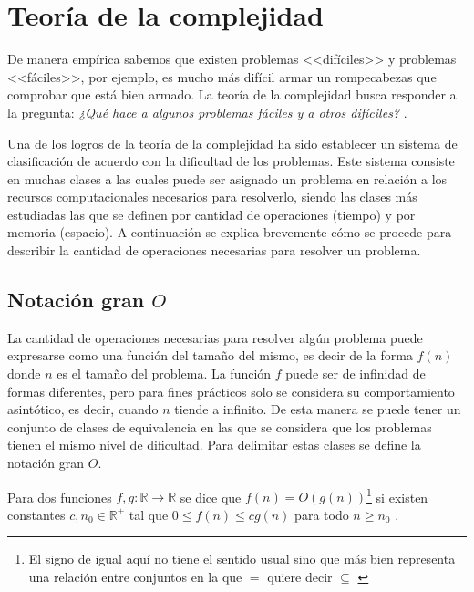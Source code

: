 \section{Teoría de la complejidad}
De manera empírica sabemos que existen problemas <<difíciles>> y problemas <<fáciles>>, por ejemplo, es mucho más difícil armar un rompecabezas que comprobar que está bien armado. La teoría de la complejidad busca responder a la pregunta: \textit{¿Qué hace a algunos problemas fáciles y a otros difíciles?} \cite{sipser1996introduction}. 

Una de los logros de la teoría de la complejidad ha sido establecer un sistema de clasificación de acuerdo con la dificultad de los problemas. Este sistema consiste en muchas clases a las cuales puede ser asignado un problema en relación a los recursos computacionales necesarios para resolverlo, siendo las clases más estudiadas las que se definen por cantidad de operaciones (tiempo) y por memoria (espacio). 
A continuación se explica brevemente cómo se procede para describir la cantidad de operaciones necesarias para resolver un problema.

\subsection*{Notación gran $O$}
La cantidad de operaciones necesarias para resolver algún problema puede expresarse como una función del tamaño del mismo, es decir de la forma $f(n)$ donde $n$ es el tamaño del problema. La función $f$ puede ser de infinidad de formas diferentes, pero para fines prácticos solo se considera su comportamiento asintótico, es decir, cuando $n$ tiende a infinito. De esta manera se puede tener un conjunto de clases de equivalencia en las que se considera que los problemas tienen el mismo nivel de dificultad. Para delimitar estas clases se define la notación gran $O$.

Para dos funciones $f,g:\mathbb{R}\rightarrow\mathbb{R}$ se dice que $f(n)= O(g(n))$\footnote{El signo de igual aquí no tiene el sentido usual sino que más bien representa una relación entre conjuntos en la que $=$ quiere decir $\subseteq$ \cite{graham1989concrete}} si existen constantes $c,n_0\in\mathbb{R}^+$ tal que $0\leq f(n)\leq cg(n)$ para todo $n\geq n_0$ \cite{cormen2009introduction}.


